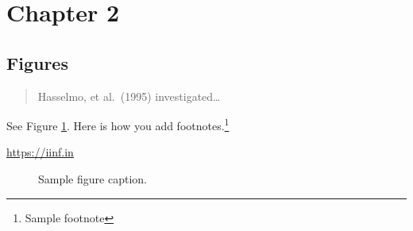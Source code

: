 \section{Chapter 2}

\subsection{Figures}

\lipsum[10]
\begin{quote}
  Hasselmo, et al.\ (1995) investigated\dots
\end{quote}

See Figure \ref{fig:fig1}. Here is how you add footnotes.\footnote{Sample footnote}

\lipsum[2]

\begin{center}
  \url{https://iinf.in}
\end{center}

\begin{figure}
  \centering
  \fbox{\rule[-.5cm]{4cm}{4cm} \rule[-.5cm]{4cm}{0cm}}
  \caption{Sample figure caption.}
  \label{fig:fig1}
\end{figure}


\lipsum[9]
